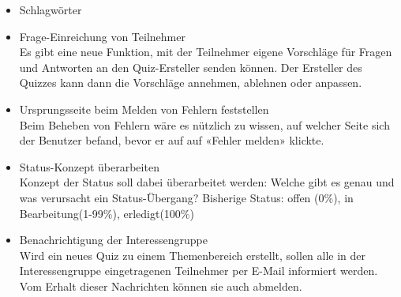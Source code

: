 \begin{itemize}
	\item Schlagwörter \\
	
	\item Frage-Einreichung von Teilnehmer \\
	Es gibt eine neue Funktion, mit der Teilnehmer eigene Vorschläge für Fragen und Antworten an den Quiz-Ersteller senden können. Der Ersteller des Quizzes kann dann die Vorschläge annehmen, ablehnen oder anpassen.
	
	\item Ursprungsseite beim Melden von Fehlern feststellen \\
	Beim Beheben von Fehlern wäre es nützlich zu wissen, auf welcher Seite sich der Benutzer befand, bevor er auf auf «Fehler melden» klickte.
	
	\item Status-Konzept überarbeiten \\
	Konzept der Status soll dabei überarbeitet werden: Welche gibt es genau und was verursacht ein Status-Übergang?
	Bisherige Status: offen (0\%), in Bearbeitung(1-99\%), erledigt(100\%)
	
	\item Benachrichtigung der Interessengruppe\\
	Wird ein neues Quiz zu einem Themenbereich erstellt, sollen alle in der Interessengruppe eingetragenen Teilnehmer per E-Mail informiert werden. Vom Erhalt dieser Nachrichten können sie auch abmelden.
	
\end{itemize}


